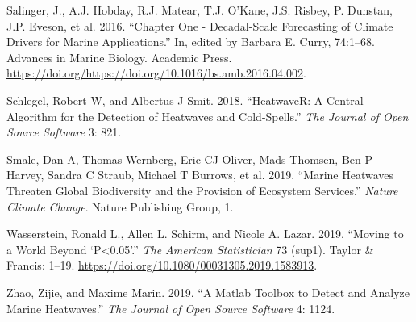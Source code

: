 \documentclass[]{article}
\begin{document}
\leavevmode\hypertarget{ref-Salinger2016}{}%
Salinger, J., A.J. Hobday, R.J. Matear, T.J. O'Kane, J.S. Risbey, P.
Dunstan, J.P. Eveson, et al. 2016. ``Chapter One - Decadal-Scale
Forecasting of Climate Drivers for Marine Applications.'' In, edited by
Barbara E. Curry, 74:1--68. Advances in Marine Biology. Academic Press.
\url{https://doi.org/https://doi.org/10.1016/bs.amb.2016.04.002}.

\leavevmode\hypertarget{ref-Schlegel2018}{}%
Schlegel, Robert W, and Albertus J Smit. 2018. ``HeatwaveR: A Central
Algorithm for the Detection of Heatwaves and Cold-Spells.'' \emph{The
Journal of Open Source Software} 3: 821.

\leavevmode\hypertarget{ref-Smale2019}{}%
Smale, Dan A, Thomas Wernberg, Eric CJ Oliver, Mads Thomsen, Ben P
Harvey, Sandra C Straub, Michael T Burrows, et al. 2019. ``Marine
Heatwaves Threaten Global Biodiversity and the Provision of Ecosystem
Services.'' \emph{Nature Climate Change}. Nature Publishing Group, 1.

\leavevmode\hypertarget{ref-Wasserstein2019}{}%
Wasserstein, Ronald L., Allen L. Schirm, and Nicole A. Lazar. 2019.
``Moving to a World Beyond `P\textless{}0.05'.'' \emph{The American
Statistician} 73 (sup1). Taylor \& Francis: 1--19.
\url{https://doi.org/10.1080/00031305.2019.1583913}.

\leavevmode\hypertarget{ref-Zhao2019}{}%
Zhao, Zijie, and Maxime Marin. 2019. ``A Matlab Toolbox to Detect and
Analyze Marine Heatwaves.'' \emph{The Journal of Open Source Software}
4: 1124.
\end{document}
